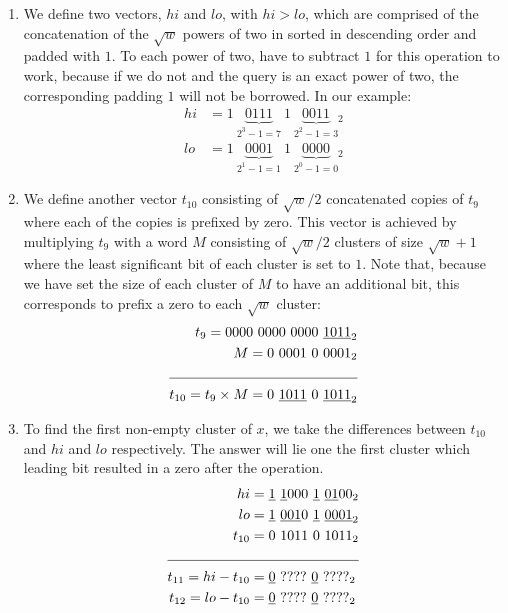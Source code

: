 \begin{enumerate}
    \item \label{blt:parallel1}
    We define two vectors, $hi$ and $lo$, with $hi > lo$, which are comprised of the concatenation of the $\sqrt{w}$ powers of two in sorted in descending order and padded with $1$. To each power of two, have to subtract $1$ for this operation to work, because if we do not and the query is an exact power of two, the corresponding padding $1$ will not be borrowed. In our example:
    \begin{align*}
        hi &= 1\ \underbrace{0111}_{2^3-1=7}\ 1\ \underbrace{0011}_{2^2-1=3}{}_2\\
        lo &= 1\ \underbrace{0001}_{2^1-1=1}\ 1\ \underbrace{0000}_{2^0-1=0}{}_2
    \end{align*}
    
    \item \label{blt:parallel2}
    We define another vector $t_{10}$ consisting of $\sqrt{w}/2$ concatenated copies of $t_9$ where each of the copies is prefixed by zero. This vector is achieved by multiplying $t_9$ with a word $M$ consisting of $\sqrt{w}/2$ clusters of size $\sqrt{w} + 1$ where the least significant bit of each cluster is set to $1$. Note that, because we have set the size of each cluster of $M$ to have an additional bit, this corresponds to prefix a zero to each $\sqrt{w}$ cluster:
    \begin{align*}
        t_9 = 0000\ 0000\ 0000\ &\underline{1011}_2\\ 
        M = 0\ 0001\ 0\ &0001_2\\ \cline{1-2}
        t_{10} = t_9 \times M = 0\ \underline{1011}\ 0\ &\underline{1011}_2
    \end{align*}
    
    \item \label{blt:parallel3}
    To find the first non-empty cluster of $x$, we take the differences between $t_{10}$ and $hi$ and $lo$ respectively. The answer will lie one the first cluster which leading bit resulted in a zero after the operation.
    \begin{align*}
                          hi &= \underline{1}\ \underline{1}000\ \underline{1}\ \underline{01}00_2\\
                          lo &= \underline{1}\ \underline{001}0\ \underline{1}\ \underline{0001}_2 \\
                      t_{10} &= 0\ 1011\ 0\ 1011_2\\ \cline{1-2}
        t_{11} = hi - t_{10} &= \underline{0}\ ????\ \underline{0}\ ????_2 \\
        t_{12} = lo - t_{10} &= \underline{0}\ ????\ \underline{0}\ ????_2
    \end{align*}
    

\end{enumerate}
